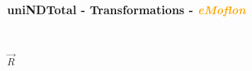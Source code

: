 \documentclass{beamer}
\begin{document}
\begin{frame}
\frametitle{uniNDTotal - \textbf{Transformations} - \textbf{\textit{\textcolor{orange}{eMoflon}}}}
\begin{figure}[ht]
\begin{mdframed}
    \centering
    \mbox{\qquad\qquad\qquad
          }
\end{mdframed}          
    \label{fig:T1}
\end{figure}

\begin{center}
$\overrightarrow{R}$
\end{center}

\begin{figure}[ht]
    \centering
    \mbox{
          }
    \label{fig:T1}
\end{figure}


\end{frame}
\end{document}
